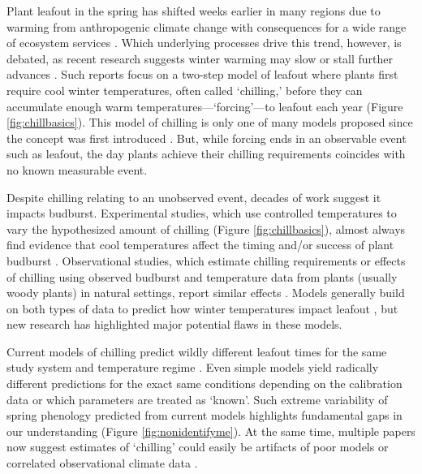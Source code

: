 \documentclass[11pt]{article}
\newcommand{\R}[1]{\label{#1}\linelabel{#1}}
\begin{document}
\newpage
Plant leafout in the spring has shifted weeks earlier in many regions due to warming from anthropogenic climate change with consequences for a wide range of ecosystem services \citep{keenan2014net,ipcc2022}. Which underlying processes drive this trend, however, is debated, as recent research suggests winter warming may slow or stall further advances \citep{fu2015,piao2017}. Such reports focus on a two-step model of leafout where plants first require cool winter temperatures, often called `chilling,' before they can accumulate enough warm temperatures---`forcing'---to leafout each year (Figure \ref{fig:chillbasics}). This model of chilling is only one of many models proposed since the concept was first introduced \citep[Figure \ref{fig:chillmodels};][]{dennis2003,basler2016evaluating,spafford2025stability}. But, while forcing ends in an observable event such as leafout, the day plants achieve their chilling requirements coincides with no known measurable event. %

Despite chilling relating to an unobserved event, decades of work suggest it impacts budburst. \R{r1expobsdatS}Experimental studies, which use controlled temperatures to vary the hypothesized amount of chilling (Figure \ref{fig:chillbasics}), almost always find evidence that cool temperatures affect the timing and/or success of plant budburst \citep{erez1971,charrier2015,baum2021}. Observational studies, which estimate chilling requirements or effects of chilling using observed budburst and temperature data from plants (usually woody plants) in natural settings, report similar effects \citep{baum2021}. Models generally build on both types of data to predict how winter temperatures impact leafout \citep{charrier2015}, but new research has highlighted major potential flaws in these models.\R{r1expobsdatE}

Current models of chilling predict wildly different leafout times for the same study system and temperature regime \citep{guy2014,chuine2016}. 
Even simple models yield radically different predictions for the exact same conditions depending\R{r1clarify} on the calibration data \citep{olsson2014process} or which parameters are treated as `known'. Such extreme variability of spring phenology predicted from current models highlights fundamental gaps in our understanding (Figure \ref{fig:nonidentifyme}). At the same time, multiple papers now suggest estimates of `chilling' could easily be artifacts of poor models or correlated observational climate data \citep{decsens,gao2024}.
\end{document}
